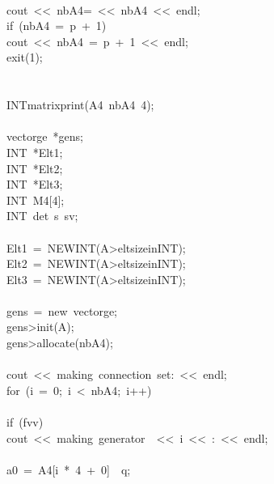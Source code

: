 \begin{tabbing}
\\[0pt]
\>cout\ <<\ nbA4=\ <<\ nbA4\ <<\ endl;\\[0pt]
\>if\ (nbA4\ =\ p\ +\ 1)\ \ \\[0pt]
\>\>cout\ <<\ nbA4\ =\ p\ +\ 1\ <<\ endl;\\[0pt]
\>\>exit(1);\\[0pt]
\>\>\\[0pt]
\\[0pt]
\>INTmatrixprint(A4\ nbA4\ 4);\\[0pt]
\\[0pt]
\>vectorge\ *gens;\\[0pt]
\>INT\ *Elt1;\\[0pt]
\>INT\ *Elt2;\\[0pt]
\>INT\ *Elt3;\\[0pt]
\>INT\ M4[4];\\[0pt]
\>INT\ det\ s\ sv;\\[0pt]
\>\\[0pt]
\>Elt1\ =\ NEWINT(A>eltsizeinINT);\\[0pt]
\>Elt2\ =\ NEWINT(A>eltsizeinINT);\\[0pt]
\>Elt3\ =\ NEWINT(A>eltsizeinINT);\\[0pt]
\\[0pt]
\>gens\ =\ new\ vectorge;\\[0pt]
\>gens>init(A);\\[0pt]
\>gens>allocate(nbA4);\\[0pt]
\>\\[0pt]
\>cout\ <<\ making\ connection\ set:\ <<\ endl;\\[0pt]
\>for\ (i\ =\ 0;\ i\ <\ nbA4;\ i++)\ \\[0pt]
\\[0pt]
\>\>if\ (fvv)\ \\[0pt]
\>\>\>cout\ <<\ making\ generator\ \ <<\ i\ <<\ :\ <<\ endl;\\[0pt]
\>\>\>\\[0pt]
\>\>a0\ =\ A4[i\ *\ 4\ +\ 0]\ \ q;\\[0pt]

\end{tabbing}
